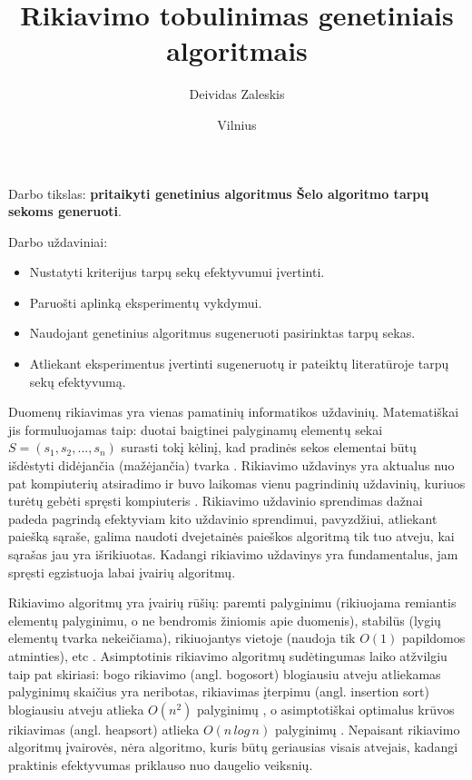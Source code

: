 \documentclass{VUMIFInfKursinis}
\institute{Informatikos institutas}  %
\title{Rikiavimo tobulinimas genetiniais algoritmais}
\author{Deividas Zaleskis}
\date{Vilnius \\ \the\year}
\begin{document}
\maketitle

\tableofcontents



Darbo tikslas:
\textbf{pritaikyti genetinius algoritmus Šelo algoritmo tarpų sekoms generuoti}.

\bigskip

Darbo uždaviniai:

\begin{itemize}
  \item Nustatyti kriterijus tarpų sekų efektyvumui įvertinti.
  \item Paruošti aplinką eksperimentų vykdymui.
  \item Naudojant genetinius algoritmus sugeneruoti pasirinktas tarpų sekas.
  \item Atliekant eksperimentus įvertinti sugeneruotų ir pateiktų literatūroje tarpų sekų efektyvumą.
\end{itemize}

Duomenų rikiavimas yra vienas pamatinių informatikos uždavinių.
Matematiškai jis formuluojamas taip:
duotai baigtinei palyginamų elementų sekai $S = (s_1, s_2, ..., s_n)$ surasti tokį
kėlinį, kad pradinės sekos elementai būtų išdėstyti didėjančia (mažėjančia) tvarka \cite{Radavičius_Baranauskas_2013}.
Rikiavimo uždavinys yra aktualus nuo pat kompiuterių atsiradimo ir buvo laikomas vienu 
pagrindinių uždavinių, kuriuos turėtų gebėti spręsti kompiuteris \cite{10.1145/356580.356581}.
Rikiavimo uždavinio sprendimas dažnai padeda pagrindą efektyviam kito uždavinio sprendimui,
pavyzdžiui, atliekant paiešką sąraše, galima naudoti dvejetainės paieškos algoritmą tik tuo atveju,
kai sąrašas jau yra išrikiuotas.
Kadangi rikiavimo uždavinys yra fundamentalus, jam spręsti egzistuoja labai įvairių algoritmų.

Rikiavimo algoritmų yra įvairių rūšių:
paremti palyginimu (rikiuojama remiantis elementų palyginimu, o ne bendromis žiniomis apie duomenis), stabilūs (lygių elementų tvarka nekeičiama),
rikiuojantys vietoje (naudoja tik $O(1)$ papildomos atminties), etc \cite{Radavičius_Baranauskas_2013}.
Asimptotinis rikiavimo algoritmų sudėtingumas laiko atžvilgiu taip pat skiriasi:
bogo rikiavimo (angl. bogosort) \cite{10.1007/978-3-540-72914-3_17} blogiausiu atveju atliekamas palyginimų skaičius yra neribotas,
rikiavimas įterpimu (angl. insertion sort) blogiausiu atveju atlieka $O(n^2)$ palyginimų \cite{bender2006insertion},
o asimptotiškai optimalus krūvos rikiavimas (angl. heapsort) \cite{10.1145/512274.512284} atlieka $O(n\,log\,n)$ palyginimų \cite{SCHAFFER199376}.
Nepaisant rikiavimo algoritmų įvairovės, nėra algoritmo, kuris būtų geriausias visais atvejais,
kadangi praktinis efektyvumas priklauso nuo daugelio veiksnių.
\end{document}
